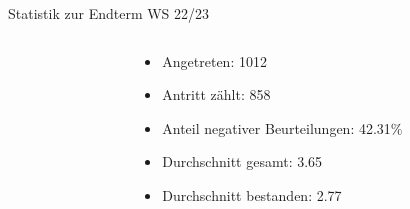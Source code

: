 \documentclass[
  german,            %
  aspectratio=169,    %
]{tumbeamer}
\begin{document}
\begin{frame}[fragile, c]{Statistik zur Endterm WS 22/23}{}

  \begin{columns}[c]
    \begin{column}{0.5\textwidth}
    \end{column}
    \begin{column}{0.5\textwidth}
      \begin{itemize}
        \item Angetreten: 1012
        \item Antritt zählt: 858
        \item Anteil negativer Beurteilungen: 42.31\%
        \item Durchschnitt gesamt: 3.65
        \item Durchschnitt bestanden: 2.77
      \end{itemize}
    \end{column}
  \end{columns}
\end{frame}
\end{document}
